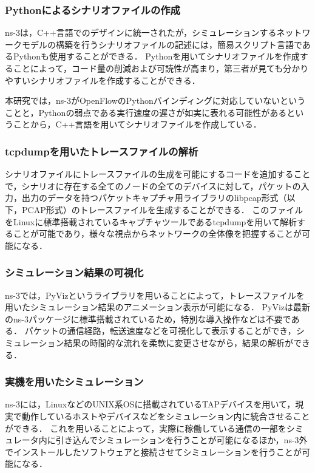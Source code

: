 \subsubsection{Pythonによるシナリオファイルの作成}

ns-3は，C++言語でのデザインに統一されたが，シミュレーションするネットワークモデルの構築を行うシナリオファイルの記述には，簡易スクリプト言語であるPythonも使用することができる．
Pythonを用いてシナリオファイルを作成することによって，コード量の削減および可読性が高まり，第三者が見ても分かりやすいシナリオファイルを作成することができる．

本研究では，ns-3がOpenFlowのPythonバインディングに対応していないということと，Pythonの弱点である実行速度の遅さが如実に表れる可能性があるということから，C++言語を用いてシナリオファイルを作成している．

\subsubsection{tcpdumpを用いたトレースファイルの解析}

シナリオファイルにトレースファイルの生成を可能にするコードを追加することで，シナリオに存在する全てのノードの全てのデバイスに対して，パケットの入力，出力のデータを持つパケットキャプチャ用ライブラリのlibpcap形式（以下，PCAP形式）のトレースファイルを生成することができる．
このファイルをLinuxに標準搭載されているキャプチャツールであるtcpdumpを用いて解析することが可能であり，様々な視点からネットワークの全体像を把握することが可能になる．

\subsubsection{シミュレーション結果の可視化}

ns-3では，PyVizというライブラリを用いることによって，トレースファイルを用いたシミュレーション結果のアニメーション表示が可能になる．
PyVizは最新のns-3パッケージに標準搭載されているため，特別な導入操作などは不要である．
パケットの通信経路，転送速度などを可視化して表示することができ，シミュレーション結果の時間的な流れを柔軟に変更させながら，結果の解析ができる．

\subsubsection{実機を用いたシミュレーション}

ns-3には，LinuxなどのUNIX系OSに搭載されているTAPデバイスを用いて，現実で動作しているホストやデバイスなどをシミュレーション内に統合させることができる．
これを用いることによって，実際に稼働している通信の一部をシミュレータ内に引き込んでシミュレーションを行うことが可能になるほか，ns-3外でインストールしたソフトウェアと接続させてシミュレーションを行うことが可能になる．

